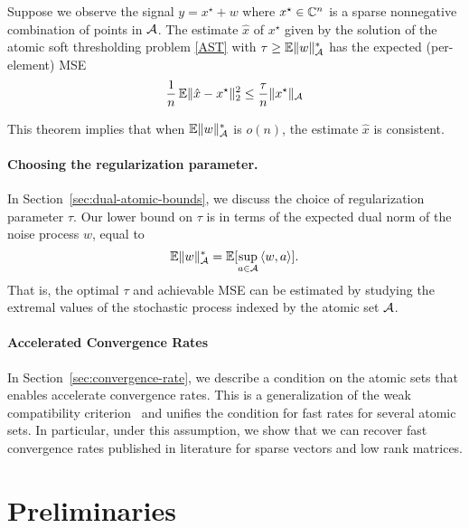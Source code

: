 \begin{theorem}
\label{cor:expected-mse}

Suppose we observe the signal $y = x^\star + w$ where $x^\star \in \mathbb{C}^n$ is a
sparse nonnegative combination of points in $\mathcal{A}$. The estimate $\hat{x}$ of
$x^\star$ given by the solution of the atomic soft thresholding problem
\eqref{AST} with $\tau \geq \operatorname{\mathbb{E}} \lVert w\rVert_{\mathcal{A}}^*$ has the expected (per-element)
MSE
\[ 
\frac{1}{n}\operatorname{\mathbb{E}} \lVert\hat{x} - x^\star\rVert_2^2 \leq \frac{\tau}{n}\lVert x^\star\rVert_{\mathcal{A}}
\]

\end{theorem}

This theorem implies that when $\operatorname{\mathbb{E}} \lVert w\rVert_{\mathcal{A}}^*$ is $o(n)$, the estimate
$\hat{x}$ is consistent.

\paragraph*{Choosing the regularization parameter.} In 
Section~\ref{sec:dual-atomic-bounds}, we discuss the choice of regularization
parameter $\tau$. Our lower bound on $\tau$ is in terms of the expected dual norm of the noise process $w$, equal to
 \[
 	\operatorname{\mathbb{E}} \lVert w\rVert_{\mathcal{A}}^* = \mathbb{E}[\sup_{a\in \mathcal{A}} {\langle w, a\rangle}].
 \]
That is, the optimal $\tau$ and achievable MSE can be estimated
by studying the extremal values of the stochastic process indexed by the atomic
set $\mathcal{A}$.

\paragraph*{Accelerated Convergence Rates} In
Section~\ref{sec:convergence-rate}, we describe a condition on the atomic sets
that enables accelerate convergence rates. This is a generalization of the weak
compatibility criterion~\cite{degeer} and unifies the condition for fast rates
for several atomic sets. In particular, under this assumption, we show that we
can recover fast convergence rates published in literature for sparse vectors
and low rank matrices.


\section{Preliminaries}
\label{sec:ast:preliminaries}

